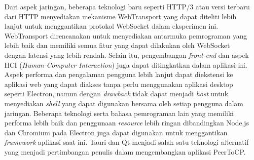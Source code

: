 Dari aspek jaringan, beberapa teknologi baru seperti HTTP/3 atau versi terbaru dari HTTP menyediakan mekanisme WebTransport yang dapat diteliti lebih lanjut untuk menggantikan protokol WebSocket dalam eksperimen ini. WebTransport direncanakan untuk menyediakan antarmuka pemrograman yang lebih baik dan memiliki semua fitur yang dapat dilakukan oleh WebSocket dengan latensi yang lebih rendah. Selain itu, pengembangan \textit{front-end} dan aspek HCI (\textit{Human-Computer Interaction}) juga dapat ditingkatkan dalam aplikasi ini. Aspek performa dan pengalaman pengguna lebih lanjut dapat diekstensi ke aplikasi web yang dapat diakses tanpa perlu menggunakan aplikasi desktop seperti Electron, namun dengan \textit{drawback} tidak dapat menjadi \textit{host} untuk menyediakan \textit{shell} yang dapat digunakan bersama oleh setiap pengguna dalam jaringan. Beberapa teknologi serta bahasa pemrograman lain yang memiliki performa lebih baik dan penggunaan \textit{resource} lebih ringan dibandingkan Node.js dan Chromium pada Electron juga dapat digunakan untuk menggantikan \textit{framework} aplikasi saat ini. Tauri dan Qt menjadi salah satu teknologi alternatif yang menjadi pertimbangan penulis dalam mengembangkan aplikasi PeerToCP.
